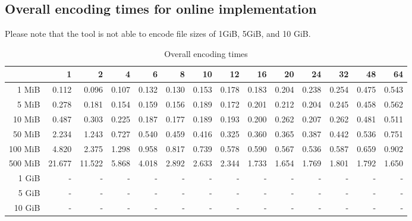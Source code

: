 \subsection{Overall encoding times for online implementation \cite{HuffmanCodingMPICUDA}}

Please note that the tool is not able to encode file sizes of 1GiB, 5GiB, and 10 GiB.

\begin{table}[!h]
	\centering
	\caption{Overall encoding times}
	\begin{tabular}{rrrrrrrrrrrrrr}
		\toprule
		\diagbox[width=7em]{Size}{Processes} & 1 & 2 & 4 & 6 & 8 & 10 & 12 & 16 & 20 & 24 & 32 & 48 & 64 \\
        \midrule
        1 MiB & 0.112 & 0.096 & 0.107 & 0.132 & 0.130 & 0.153 & 0.178 & 0.183 & 0.204 & 0.238 & 0.254 & 0.475 & 0.543 \\
        5 MiB & 0.278 & 0.181 & 0.154 & 0.159 & 0.156 & 0.189 & 0.172 & 0.201 & 0.212 & 0.204 & 0.245 & 0.458 & 0.562 \\
        10 MiB & 0.487 & 0.303 & 0.225 & 0.187 & 0.177 & 0.189 & 0.193 & 0.200 & 0.262 & 0.207 & 0.262 & 0.481 & 0.511 \\
        50 MiB & 2.234 & 1.243 & 0.727 & 0.540 & 0.459 & 0.416 & 0.325 & 0.360 & 0.365 & 0.387 & 0.442 & 0.536 & 0.751 \\
        100 MiB & 4.820 & 2.375 & 1.298 & 0.958 & 0.817 & 0.739 & 0.578 & 0.590 & 0.567 & 0.536 & 0.587 & 0.659 & 0.902 \\
        500 MiB & 21.677 & 11.522 & 5.868 & 4.018 & 2.892 & 2.633 & 2.344 & 1.733 & 1.654 & 1.769 & 1.801 & 1.792 & 1.650 \\
        1 GiB & - & - & - & - & - & - & - & - & - & - & - & - & - \\
        5 GiB & - & - & - & - & - & - & - & - & - & - & - & - & - \\
        10 GiB & - & - & - & - & - & - & - & - & - & - & - & - & - \\
		\bottomrule
	\end{tabular}
\end{table}
